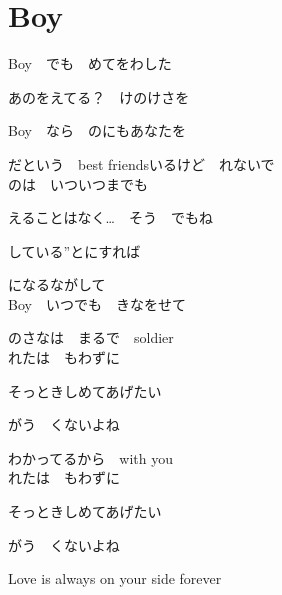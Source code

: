 \section{ Boy}
\large{

Boy　でも　めてをわした

あのをえてる？　けのけさを

Boy　なら　のにもあなたを

だという　best friendsいるけど　れないで
\\

のは　いついつまでも

えることはなく…　そう　でもね

している”とにすれば

になるながして
\\

Boy　いつでも　きなをせて

のさなは　まるで　soldier
\\

れたは　もわずに

そっときしめてあげたい

がう　くないよね

わかってるから　with you
\\

れたは　もわずに

そっときしめてあげたい

がう　くないよね

Love is always on your side forever

}